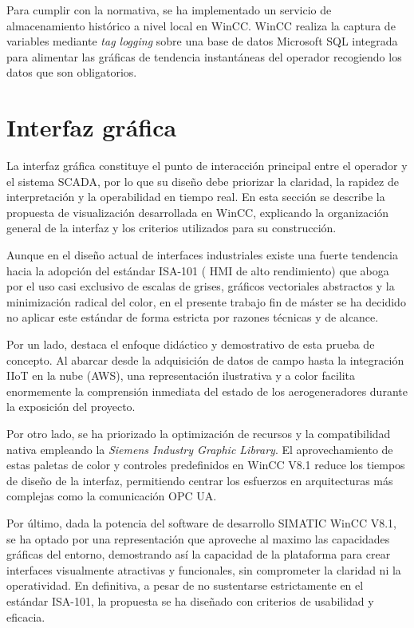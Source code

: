 Para cumplir con la normativa, se ha implementado un servicio de almacenamiento histórico a nivel local en WinCC. WinCC realiza la captura de variables mediante \textit{tag logging} sobre una base de datos Microsoft SQL integrada para alimentar las gráficas de tendencia instantáneas del operador recogiendo los datos que son obligatorios.
    

\section{Interfaz gráfica}

La interfaz gráfica constituye el punto de interacción principal entre el operador y el sistema SCADA, por lo que su diseño debe priorizar la claridad, la rapidez de interpretación y la operabilidad en tiempo real. En esta sección se describe la propuesta de visualización desarrollada en WinCC, explicando la organización general de la interfaz y los criterios utilizados para su construcción.\par

Aunque en el diseño actual de interfaces industriales existe una fuerte tendencia hacia la adopción del estándar ISA-101 ( \ac{HMI} de alto rendimiento) que aboga por el uso casi exclusivo de escalas de grises, gráficos vectoriales abstractos y la minimización radical del color, en el presente trabajo fin de máster se ha decidido no aplicar este estándar de forma estricta por  razones técnicas y de alcance.\par

Por un lado, destaca el enfoque didáctico y demostrativo de esta prueba de concepto. Al abarcar desde la adquisición de datos de campo hasta la integración IIoT en la nube (AWS), una representación ilustrativa y a color facilita enormemente la comprensión inmediata del estado de los aerogeneradores durante la exposición del proyecto.\par

Por otro lado, se ha priorizado la optimización de recursos y la compatibilidad nativa empleando la \textit{Siemens Industry Graphic Library}. El aprovechamiento de estas paletas de color y controles predefinidos en WinCC V8.1 reduce los tiempos de diseño de la interfaz, permitiendo centrar los esfuerzos en arquitecturas más complejas como la comunicación \ac{OPC UA}.

Por último, dada la potencia del software de desarrollo SIMATIC WinCC V8.1, se ha optado por una representación que aproveche al maximo las capacidades gráficas del entorno, demostrando así la capacidad de la plataforma para crear interfaces visualmente atractivas y funcionales, sin comprometer la claridad ni la operatividad. En definitiva, a pesar de no sustentarse estrictamente en el estándar ISA-101, la propuesta se ha diseñado con criterios de usabilidad y eficacia.


